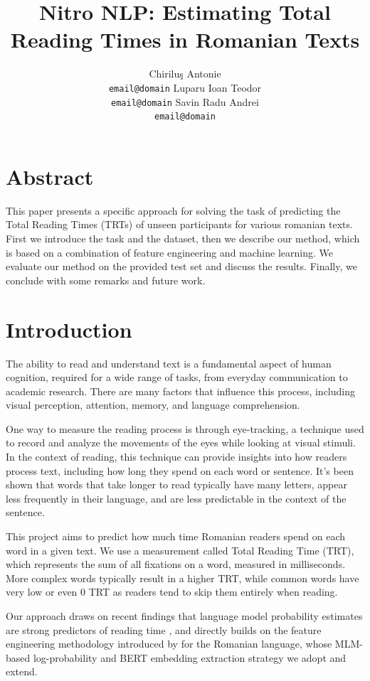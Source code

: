 \documentclass[12pt]{article}
\title{Nitro NLP: Estimating Total Reading Times in Romanian Texts}
\author{Chirilu\c{s} Antonie \\ \texttt{email@domain}
  \And
  Luparu Ioan Teodor \\ \texttt{email@domain}
  \AND
  Savin Radu Andrei \\ \texttt{email@domain}
}
\begin{document}
\maketitle
\onecolumn

\section*{Abstract}

This paper presents a specific approach for solving the task of predicting the Total Reading Times (TRTs) of unseen participants for various romanian texts. First we introduce the task and the dataset, then we describe our method, which is based on a combination of feature engineering and machine learning. We evaluate our method on the provided test set and discuss the results. Finally, we conclude with some remarks and future work.

\section{Introduction}

The ability to read and understand text is a fundamental aspect of human cognition, required for a wide range of tasks, from everyday communication to academic research. There are many factors that influence this process, including visual perception, attention, memory, and language comprehension.

One way to measure the reading process is through eye-tracking, a technique used to record and analyze the movements of the eyes while looking at visual stimuli. In the context of reading, this technique can provide insights into how readers process text, including how long they spend on each word or sentence. It's been shown that words that take longer to read typically have many letters, appear less frequently in their language, and are less predictable in the context of the sentence.

This project aims to predict how much time Romanian readers spend on each word in a given text. We use a measurement called Total Reading Time (TRT), which represents the sum of all fixations on a word, measured in milliseconds. More complex words typically result in a higher TRT, while common words have very low or even 0 TRT as readers tend to skip them entirely when reading.

Our approach draws on recent findings that language model probability estimates are strong predictors of reading time \cite{hollenstein2021multilingual}, and directly builds on the feature engineering methodology introduced by \citeauthor{hodivoianu2025predicting} for the Romanian language, whose MLM-based log-probability and BERT embedding extraction strategy we adopt and extend.
\end{document}
